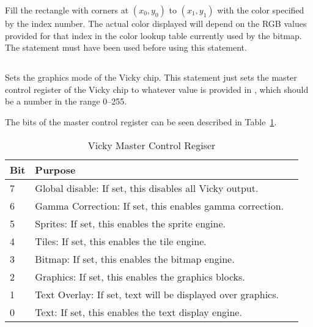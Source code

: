 \documentclass{report}
\begin{document}
    Fill the rectangle with corners at $(x_0, y_0)$ to $(x_1, y_1)$ with the color
    specified by the  index number.
    The actual color displayed will depend on the RGB values provided for
    that index in the color lookup table currently used by the bitmap.
    The  statement must have been used before using
    this statement.

    \subsection*{ }

    Sets the graphics mode of the Vicky chip.
    This statement just sets the master control register of the Vicky chip to
    whatever value is provided in , which should be a number in the range 0--255.

    The bits of the master control register can be seen described in Table~\ref{vicky_mcr}.

    \begin{table}[!htb]
        \begin{center}
            \begin{tabular}{|l|l|l|} \hline
                Bit & Purpose \\ \hline\hline
                7 & Global disable: If set, this disables all Vicky output. \\ \hline
                6 & Gamma Correction: If set, this enables gamma correction. \\ \hline
                5 & Sprites: If set, this enables the sprite engine. \\ \hline
                4 & Tiles: If set, this enables the tile engine. \\ \hline
                3 & Bitmap: If set, this enables the bitmap engine. \\ \hline
                2 & Graphics: If set, this enables the graphics blocks. \\ \hline
                1 & Text Overlay: If set, text will be displayed over graphics. \\ \hline
                0 & Text: If set, this enables the text display engine. \\ \hline
            \end{tabular}
            \caption{Vicky Master Control Regiser}
            \label{vicky_mcr}
        \end{center}
    \end{table}
\end{document}
